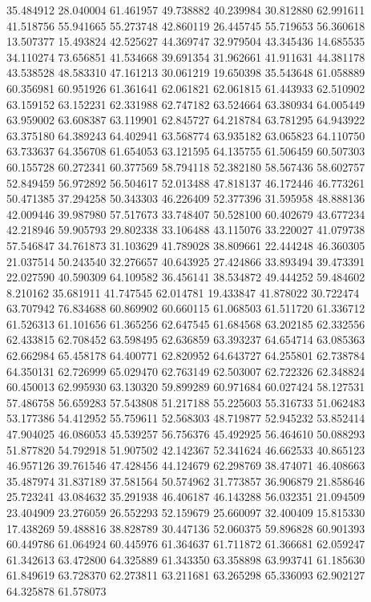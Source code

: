 35.484912
28.040004
61.461957
49.738882
40.239984
30.812880
62.991611
41.518756
55.941665
55.273748
42.860119
26.445745
55.719653
56.360618
13.507377
15.493824
42.525627
44.369747
32.979504
43.345436
14.685535
34.110274
73.656851
41.534668
39.691354
31.962661
41.911631
44.381178
43.538528
48.583310
47.161213
30.061219
19.650398
35.543648
61.058889
60.356981
60.951926
61.361641
62.061821
62.061815
61.443933
62.510902
63.159152
63.152231
62.331988
62.747182
63.524664
63.380934
64.005449
63.959002
63.608387
63.119901
62.845727
64.218784
63.781295
64.943922
63.375180
64.389243
64.402941
63.568774
63.935182
63.065823
64.110750
63.733637
64.356708
61.654053
63.121595
64.135755
61.506459
60.507303
60.155728
60.272341
60.377569
58.794118
52.382180
58.567436
58.602757
52.849459
56.972892
56.504617
52.013488
47.818137
46.172446
46.773261
50.471385
37.294258
50.343303
46.226409
52.377396
31.595958
48.888136
42.009446
39.987980
57.517673
33.748407
50.528100
60.402679
43.677234
42.218946
59.905793
29.802338
33.106488
43.115076
33.220027
41.079738
57.546847
34.761873
31.103629
41.789028
38.809661
22.444248
46.360305
21.037514
50.243540
32.276657
40.643925
27.424866
33.893494
39.473391
22.027590
40.590309
64.109582
36.456141
38.534872
49.444252
59.484602
8.210162
35.681911
41.747545
62.014781
19.433847
41.878022
30.722474
63.707942
76.834688
60.869902
60.660115
61.068503
61.511720
61.336712
61.526313
61.101656
61.365256
62.647545
61.684568
63.202185
62.332556
62.433815
62.708452
63.598495
62.636859
63.393237
64.654714
63.085363
62.662984
65.458178
64.400771
62.820952
64.643727
64.255801
62.738784
64.350131
62.726999
65.029470
62.763149
62.503007
62.722326
62.348824
60.450013
62.995930
63.130320
59.899289
60.971684
60.027424
58.127531
57.486758
56.659283
57.543808
51.217188
55.225603
55.316733
51.062483
53.177386
54.412952
55.759611
52.568303
48.719877
52.945232
53.852414
47.904025
46.086053
45.539257
56.756376
45.492925
56.464610
50.088293
51.877820
54.792918
51.907502
42.142367
52.341624
46.662533
40.865123
46.957126
39.761546
47.428456
44.124679
62.298769
38.474071
46.408663
35.487974
31.837189
37.581564
50.574962
31.773857
36.906879
21.858646
25.723241
43.084632
35.291938
46.406187
46.143288
56.032351
21.094509
23.404909
23.276059
26.552293
52.159679
25.660097
32.400409
15.815330
17.438269
59.488816
38.828789
30.447136
52.060375
59.896828
60.901393
60.449786
61.064924
60.445976
61.364637
61.711872
61.366681
62.059247
61.342613
63.472800
64.325889
61.343350
63.358898
63.993741
61.185630
61.849619
63.728370
62.273811
63.211681
63.265298
65.336093
62.902127
64.325878
61.578073
